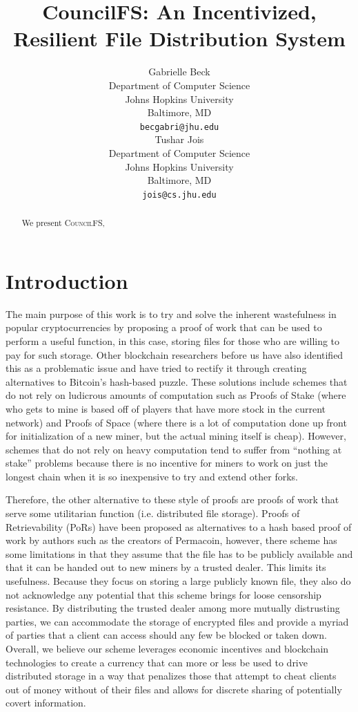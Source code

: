 \documentclass{article}
\title{CouncilFS: An Incentivized, Resilient File Distribution System}
\author{
  Gabrielle Beck \\
  Department of Computer Science\\
  Johns Hopkins University \\
 Baltimore, MD \\
  \texttt{becgabri@jhu.edu} \\
   \And
 Tushar Jois \\
  Department of Computer Science\\
  Johns Hopkins University\\
  Baltimore, MD \\
  \texttt{jois@cs.jhu.edu} \\
}
\begin{document}
\maketitle

\begin{abstract}
  We present \textsc{CouncilFS},
\end{abstract}




\section{Introduction}

The main purpose of this work is to try and solve the inherent wastefulness in
popular cryptocurrencies by proposing a proof of work that can be used to
perform a useful function, in this case, storing files for those who are willing
to pay for such storage. Other blockchain researchers before us have also
identified this as a problematic issue and have tried to rectify it through
creating alternatives to Bitcoin’s hash-based puzzle. These solutions include
schemes that do not rely on ludicrous amounts of computation such as Proofs of
Stake (where who gets to mine is based off of players that have more stock in
the current network) and Proofs of Space (where there is a lot of computation
done up front for initialization of a new miner, but the actual mining itself is
cheap). However, schemes that do not rely on heavy computation tend to suffer
from ``nothing at stake'' problems because there is no incentive for miners to
work on just the longest chain when it is so inexpensive to try and extend other
forks.

Therefore, the other alternative to these style of proofs are proofs of
work that serve some utilitarian function (i.e. distributed file storage).
Proofs of Retrievability (PoRs) have been proposed as alternatives to a hash
based proof of work by authors such as the creators of Permacoin, however, there
scheme has some limitations in that they assume that the file has to be publicly
available and that it can be handed out to new miners by a trusted dealer. This
limits its usefulness. Because they focus on storing a large publicly known
file, they also do not acknowledge any potential that this scheme brings for
loose censorship resistance. By distributing the trusted dealer among more
mutually distrusting parties, we can accommodate the storage of encrypted files
and provide a myriad of parties that a client can access should any few be
blocked or taken down. Overall, we believe our scheme leverages economic
incentives and blockchain technologies to create a currency that can more or
less be used to drive distributed storage in a way that penalizes those that
attempt to cheat clients out of money without of their files and allows for
discrete sharing of potentially covert information.
\end{document}
